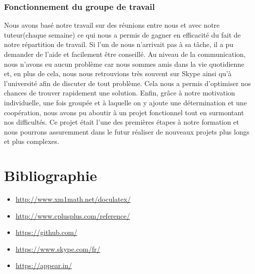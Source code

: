 \documentclass{article}
\begin{document}
        \subsubsection{\large Fonctionnement du groupe de travail}
        \hspace{0.5cm}Nous avons basé notre travail sur des réunions entre nous et avec notre tuteur(chaque semaine) ce qui nous a permis de gagner en efficacité du fait de notre répartition de travail. Si l’un de nous n’arrivait pas à sa tâche, il a pu demander de l’aide et facilement être conseillé.
        Au niveau de la communication, nous n’avons eu aucun problème car nous sommes amis dans la vie quotidienne et, en plus de cela, nous nous retrouvions très souvent sur Skype ainsi qu’à l’université afin de discuter de tout problème. Cela nous a permis d'optimiser nos chances de trouver rapidement une solution.
        Enfin, grâce à notre motivation individuelle, une fois groupée et à laquelle on y ajoute une détermination et une coopération, nous avons pu aboutir à un projet fonctionnel tout en surmontant nos difficultés. Ce projet était l'une des premières étapes à notre formation et nous pourrons assuremment dans le futur réaliser de nouveaux projets plus longs et plus complexes.

\section{\LARGE Bibliographie}
\begin{itemize}
    \item \url{http://www.xm1math.net/doculatex/}
    \item \url{http://www.cplusplus.com/reference/}
    \item \url{https://github.com/}
    \item \url{https://www.skype.com/fr/}
    \item \url{https://appear.in/}
\end{itemize}
\end{document}
